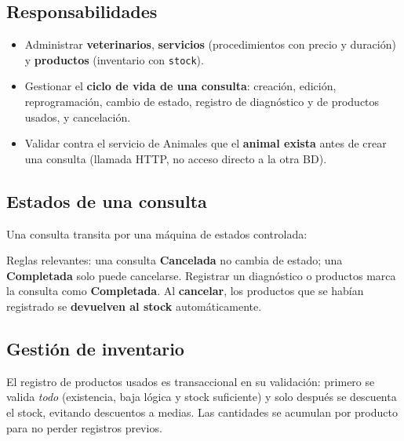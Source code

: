 \documentclass[11pt,a4paper]{article}
\begin{document}
\subsection{Responsabilidades}
\begin{itemize}[leftmargin=1.4em]
  \item Administrar \textbf{veterinarios}, \textbf{servicios} (procedimientos con
        precio y duración) y \textbf{productos} (inventario con \texttt{stock}).
  \item Gestionar el \textbf{ciclo de vida de una consulta}: creación, edición,
        reprogramación, cambio de estado, registro de diagnóstico y de productos
        usados, y cancelación.
  \item Validar contra el servicio de Animales que el \textbf{animal exista} antes
        de crear una consulta (llamada HTTP, no acceso directo a la otra BD).
\end{itemize}

\subsection{Estados de una consulta}
Una consulta transita por una máquina de estados controlada:
\begin{center}
\end{center}
\noindent
Reglas relevantes: una consulta \textbf{Cancelada} no cambia de estado; una
\textbf{Completada} solo puede cancelarse. Registrar un diagnóstico o productos
marca la consulta como \textbf{Completada}. Al \textbf{cancelar}, los productos que
se habían registrado se \textbf{devuelven al stock} automáticamente.

\subsection{Gestión de inventario}
El registro de productos usados es transaccional en su validación: primero se
valida \emph{todo} (existencia, baja lógica y stock suficiente) y solo después se
descuenta el stock, evitando descuentos a medias. Las cantidades se acumulan por
producto para no perder registros previos.
\end{document}

